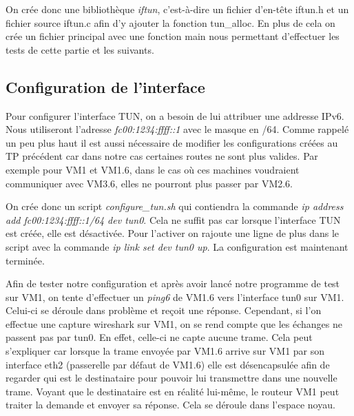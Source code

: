 \documentclass[a4paper, 12pt]{article}
\begin{document}
    \medbreak{}

    On crée donc une bibliothèque \textit{iftun}, c'est-à-dire un fichier
    d'en-tête iftun.h et un fichier source iftun.c afin d'y ajouter la fonction
    tun\_alloc. En plus de cela on crée un fichier principal avec une fonction 
    main nous permettant d'effectuer les tests de cette partie et les suivants.

    \subsection{Configuration de l'interface}
    Pour configurer l'interface TUN, on a besoin de lui attribuer une addresse
    IPv6. Nous utiliseront l'adresse \textit{fc00:1234:ffff::1} avec le masque
    en /64. Comme rappelé un peu plus haut il est aussi nécessaire de modifier
    les configurations créées au TP précédent car dans notre cas certaines 
    routes ne sont plus valides. Par exemple pour VM1 et VM1.6, dans le cas où
    ces machines voudraient communiquer avec VM3.6, elles ne pourront plus 
    passer par VM2.6.

    \medbreak{}

    On crée donc un script \textit{configure\_tun.sh} qui contiendra la commande
    \textit{ip address add fc00:1234:ffff::1/64 dev tun0}. Cela ne suffit pas 
    car lorsque l'interface TUN est créée, elle est désactivée. Pour l'activer 
    on rajoute une ligne de plus dans le script avec la commande \textit{ip 
    link set dev tun0 up}. La configuration est maintenant terminée.

    \medbreak{}

    Afin de tester notre configuration et après avoir lancé notre programme de 
    test sur VM1, on tente d'effectuer un \textit{ping6} de VM1.6 vers 
    l'interface tun0 sur VM1. Celui-ci se déroule dans problème et reçoit une 
    réponse. Cependant, si l'on effectue une capture wireshark sur VM1, on se 
    rend compte que les échanges ne passent pas par tun0. En effet, celle-ci ne
    capte aucune trame. Cela peut s'expliquer car lorsque la trame envoyée par 
    VM1.6 arrive sur VM1 par son interface eth2 (passerelle par défaut de 
    VM1.6) elle est désencapsulée afin de regarder qui est le destinataire pour
    pouvoir lui transmettre dans une nouvelle trame. Voyant que le destinataire
    est en réalité lui-même, le routeur VM1 peut traiter la demande et envoyer 
    sa réponse. Cela se déroule dans l'espace noyau.

    \medbreak{}
\end{document}
